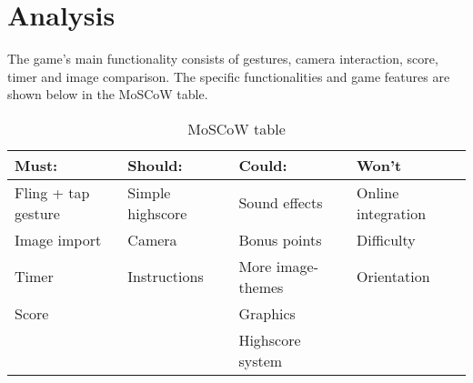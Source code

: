 \section{Analysis}
The game’s main functionality consists of gestures, camera interaction, score, timer and image comparison. The specific functionalities and game features are shown below in the MoSCoW table.

\begin{table}[H]
	\begin{longtable}{|l|l|l|l|}
		\hline
		Must: & Should: & Could: & Won't \\ \hline
		Fling + tap gesture & Simple highscore & Sound effects & Online integration \\
		Image import & Camera & Bonus points & Difficulty \\
		Timer & Instructions & More image-themes & Orientation \\
		Score & & Graphics &  \\
		& & Highscore system & \\ \hline
	\end{longtable}
	\caption{MoSCoW table}
\end{table}
